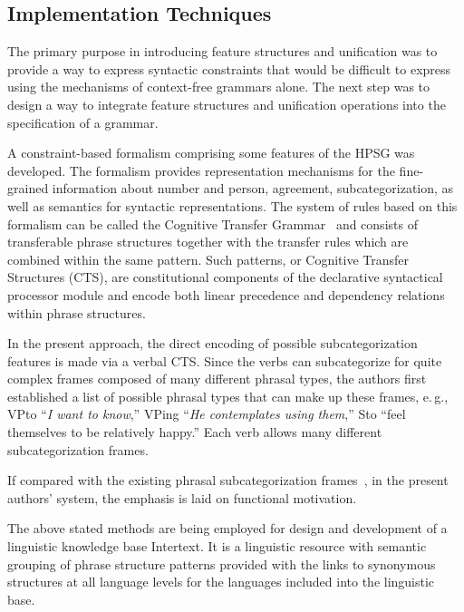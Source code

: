 \begin{multicols}{2}
\section{Implementation Techniques}

\noindent
     The primary purpose in introducing feature structures and unification was
to provide a way to express syntactic constraints that would be difficult to 
express using the mechanisms of context-free grammars alone. The next step was 
to design a way to integrate feature structures and unification operations into the 
specification of a grammar.
     
     A constraint-based formalism comprising some features of the HPSG was 
developed. The formalism provides representation mechanisms for the fine-grained 
information about number and person, agreement, subcategorization, as well as 
semantics for syntactic representations. The system of rules based on this 
formalism can be called the Cognitive Transfer Grammar~\cite{18-koz} and 
consists of transferable phrase structures together with the transfer rules which are 
combined within the same pattern. Such patterns, or Cognitive Transfer Structures 
(CTS), are constitutional components of the declarative syntactical processor 
module and encode both linear precedence and dependency relations within phrase 
structures. 
     
     In the present approach, the direct encoding of possible subcategorization features is 
made via a verbal CTS. Since the verbs can subcategorize for quite complex 
frames composed of many different phrasal types, the authors first established a list of 
possible phrasal types that can make up these frames, e.\,g., VPto ``\textit{I want 
to know},'' VPing ``\textit{He contemplates using them},'' 
Sto ``feel themselves to 
be relatively happy.'' Each verb allows many different subcategorization frames. 
     
     If compared with the existing phrasal subcategorization 
     frames~\cite{19-koz}, in the present authors' system, the emphasis is laid on functional 
motivation.
     
     The above stated methods are being employed for design and development 
of a linguistic knowledge base Intertext. It is a linguistic resource with semantic 
grouping of phrase structure patterns provided with the links to synonymous 
structures at all language levels for the languages included into the linguistic base. 
     

\end{multicols}

